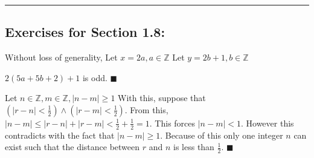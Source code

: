 \documentclass[12pt]{article}  %
\newcommand{\AND}{\wedge}
\begin{document}
\rule{6in}{.1pt}       %









\subsection*{Exercises for Section 1.8:}     

\newline
{}\newline
\newline
Without loss of generality,\newline
Let $x=2a, a\in\mathbb{Z}$\newline
Let $y=2b+1, b\in\mathbb{Z}$\newline

\newline
$2(5a+5b+2)+1$ is odd.\newline
$\blacksquare$

\newline
{}\newline
\newline
Let $n\in\mathbb{Z}, m\in\mathbb{Z}, |n-m|\geq1$\newline
With this, suppose that $(|r-n|<\frac{1}{2})\AND(|r-m|<\frac{1}{2})$.\newline
From this, $|n-m|\leq|r-n|+|r-m|<\frac{1}{2}+\frac{1}{2}=1$.\newline
This forces $|n-m|<1$. However this contradicts with the fact that $|n-m|\geq1$.\newline
Because of this only one integer $n$ can exist such that the distance between $r$ and $n$ is less than $\frac{1}{2}$.
$\blacksquare$
\end{document}
